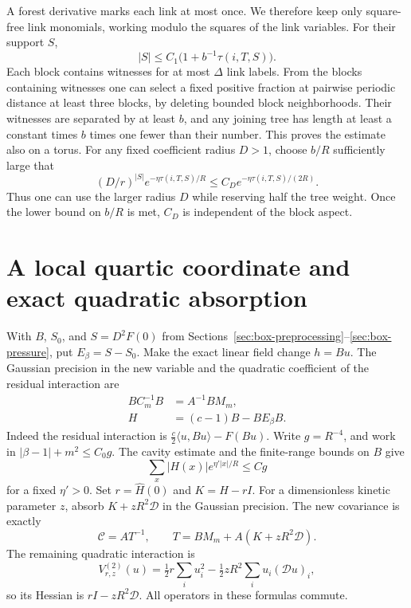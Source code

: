 \documentclass[11pt]{article}
\begin{document}
A forest derivative marks each link at most once. We therefore
keep only square-free link monomials, working modulo the squares of
the link variables. For their support \(S\),
\[
 |S|\le C_1\bigl(1+b^{-1}\tau(i,T,S)\bigr).
\]
Each block contains witnesses for at most \(\Delta\) link labels.
From the blocks containing witnesses one can select a fixed
positive fraction at pairwise periodic distance at least three
blocks, by deleting bounded block neighborhoods. Their witnesses
are separated by at least \(b\), and any joining tree has length
at least a constant times \(b\) times one fewer than their number.
This proves the estimate also on a torus. For any fixed coefficient
radius \(D>1\), choose \(b/R\) sufficiently large that
\begin{equation}\label{eq:link-radius-gain}
 (D/r)^{|S|}e^{-\eta\tau(i,T,S)/R}
     \le C_D e^{-\eta\tau(i,T,S)/(2R)} .
\end{equation}
Thus one can use the larger radius \(D\) while reserving half the
tree weight. Once the lower bound on \(b/R\) is met, \(C_D\) is
independent of the block aspect.

\section{A local quartic coordinate and exact quadratic absorption}

With \(B\), \(S_0\), and \(S=D^2F(0)\) from
Sections~\ref{sec:box-preprocessing}--\ref{sec:box-pressure}, put
\(E_\beta=S-S_0\). Make the exact linear field
change \(h=Bu\). The Gaussian precision in the new variable and the
quadratic coefficient of the residual interaction are
\begin{align*}
 B C_m^{-1} B&=A^{-1}B M_m,\\
 H&=(c-1)B-BE_\beta B .
\end{align*}
Indeed the residual interaction is
\(\frac c2\langle u,Bu\rangle-F(Bu)\). Write \(g=R^{-4}\), and
work in \(|\beta-1|+m^2\le C_0g\). The cavity estimate and the
finite-range bounds on \(B\) give
\begin{equation}\label{eq:fc_Hnorm}
 \sum_x |H(x)|e^{\eta'|x|/R}\le Cg
\end{equation}
for a fixed \(\eta'>0\). Set \(r=\widehat H(0)\) and \(K=H-rI\).
For a dimensionless kinetic parameter \(z\), absorb \(K+zR^2\mathcal D\) in the Gaussian precision. The new covariance
is exactly
\begin{equation}\label{eq:fc_newcov}
 \mathscr C=A T^{-1},\qquad
 T=BM_m+A(K+zR^2\mathcal D).
\end{equation}
The remaining quadratic interaction is
\[
 V^{(2)}_{r,z}(u)=\tfrac12r\sum_i u_i^2
       -\tfrac12zR^2\sum_i u_i(\mathcal D u)_i,
\]
so its Hessian is \(rI-zR^2\mathcal D\). All operators in these formulas commute.
\end{document}
